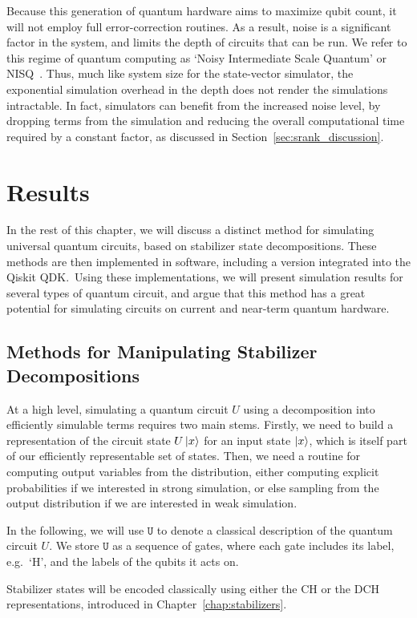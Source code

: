 Because this generation of quantum hardware aims to  maximize qubit count, it will not employ full error-correction routines. As a result, noise is a significant factor in the system, and limits the depth of circuits that can be run. We refer to this regime of quantum computing as `Noisy Intermediate Scale Quantum' or NISQ~\cite{Preskill2018}. Thus, much like system size for the state-vector simulator, the exponential simulation overhead in the depth does not render the simulations intractable. In fact, simulators can benefit from the increased noise level, by dropping terms from the simulation and reducing the overall computational time required by a constant factor, as discussed in Section~\ref{sec:srank_discussion}.
\section{Results}
In the rest of this chapter, we will discuss a distinct method for simulating universal quantum circuits, based on stabilizer state decompositions. These methods are then implemented in software, including a version integrated into the Qiskit QDK.\ Using these implementations, we will present simulation results for several types of quantum circuit, and argue that this method has a great potential for simulating circuits on current and near-term quantum hardware.
\subsection{Methods for Manipulating Stabilizer Decompositions}\label{sec:manipulating_decompositions}
At a high level, simulating a quantum circuit $U$ using a decomposition into efficiently simulable terms requires two main stems. Firstly, we need to build a representation of the circuit state $U\ket{x}$ for an input state $\ket{x}$, which is itself part of our efficiently representable set of states. Then, we need a routine for computing output variables from the distribution, either computing explicit probabilities if we interested in strong simulation, or else sampling from the output distribution if we are interested in weak simulation.\par
In the following, we will use $\mathtt{U}$ to denote a classical description of the quantum circuit $U$. We store $\mathtt{U}$ as a sequence of gates, where each gate includes its label, e.g.\ `H', and the labels of the qubits it acts on.\par
Stabilizer states will be encoded classically using either the CH or the DCH representations, introduced in Chapter~\ref{chap:stabilizers}.
